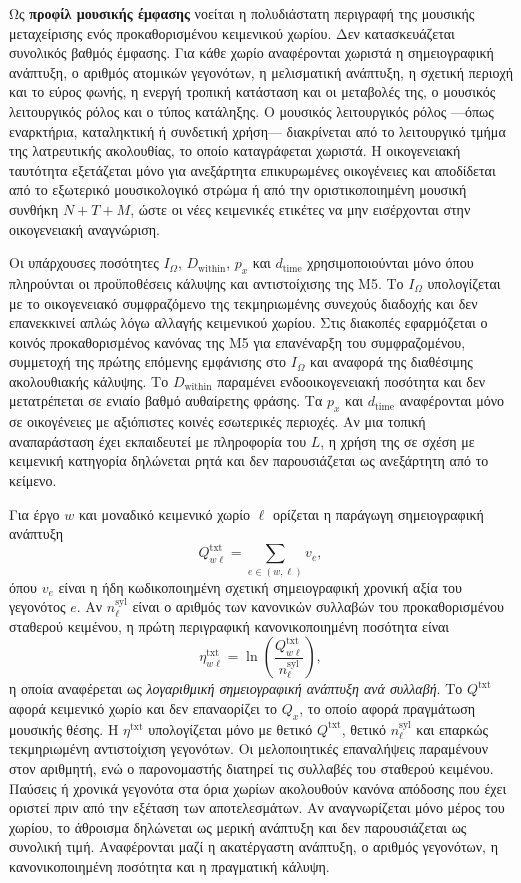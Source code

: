 \documentclass[11pt,a4paper]{article}
\begin{document}
Ως \textbf{προφίλ μουσικής έμφασης} νοείται η πολυδιάστατη περιγραφή της μουσικής μεταχείρισης ενός προκαθορισμένου κειμενικού χωρίου. Δεν κατασκευάζεται συνολικός βαθμός έμφασης. Για κάθε χωρίο αναφέρονται χωριστά η σημειογραφική ανάπτυξη, ο αριθμός ατομικών γεγονότων, η μελισματική ανάπτυξη, η σχετική περιοχή και το εύρος φωνής, η ενεργή τροπική κατάσταση και οι μεταβολές της, ο μουσικός λειτουργικός ρόλος και ο τύπος κατάληξης. Ο μουσικός λειτουργικός ρόλος ---όπως εναρκτήρια, καταληκτική ή συνδετική χρήση--- διακρίνεται από το λειτουργικό τμήμα της λατρευτικής ακολουθίας, το οποίο καταγράφεται χωριστά. Η οικογενειακή ταυτότητα εξετάζεται μόνο για ανεξάρτητα επικυρωμένες οικογένειες και αποδίδεται από το εξωτερικό μουσικολογικό στρώμα ή από την οριστικοποιημένη μουσική συνθήκη $N{+}T{+}M$, ώστε οι νέες κειμενικές ετικέτες να μην εισέρχονται στην οικογενειακή αναγνώριση.

Οι υπάρχουσες ποσότητες $I_{\Omega}$, $D_{\mathrm{within}}$, $p_x$ και $d_{\mathrm{time}}$ χρησιμοποιούνται μόνο όπου πληρούνται οι προϋποθέσεις κάλυψης και αντιστοίχισης της M5. Το $I_{\Omega}$ υπολογίζεται με το οικογενειακό συμφραζόμενο της τεκμηριωμένης συνεχούς διαδοχής και δεν επανεκκινεί απλώς λόγω αλλαγής κειμενικού χωρίου. Στις διακοπές εφαρμόζεται ο κοινός προκαθορισμένος κανόνας της M5 για επανέναρξη του συμφραζομένου, συμμετοχή της πρώτης επόμενης εμφάνισης στο $I_{\Omega}$ και αναφορά της διαθέσιμης ακολουθιακής κάλυψης. Το $D_{\mathrm{within}}$ παραμένει ενδοοικογενειακή ποσότητα και δεν μετατρέπεται σε ενιαίο βαθμό αυθαίρετης φράσης. Τα $p_x$ και $d_{\mathrm{time}}$ αναφέρονται μόνο σε οικογένειες με αξιόπιστες κοινές εσωτερικές περιοχές. Αν μια τοπική αναπαράσταση έχει εκπαιδευτεί με πληροφορία του $L$, η χρήση της σε σχέση με κειμενική κατηγορία δηλώνεται ρητά και δεν παρουσιάζεται ως ανεξάρτητη από το κείμενο.

Για έργο $w$ και μοναδικό κειμενικό χωρίο $\ell$ ορίζεται η παράγωγη σημειογραφική ανάπτυξη
\[
Q^{\mathrm{txt}}_{w\ell}=\sum_{e\in(w,\ell)} v_e,
\]
όπου $v_e$ είναι η ήδη κωδικοποιημένη σχετική σημειογραφική χρονική αξία του γεγονότος $e$. Αν $n^{\mathrm{syl}}_{\ell}$ είναι ο αριθμός των κανονικών συλλαβών του προκαθορισμένου σταθερού κειμένου, η πρώτη περιγραφική κανονικοποιημένη ποσότητα είναι
\[
\eta^{\mathrm{txt}}_{w\ell}=\ln\!\left(\frac{Q^{\mathrm{txt}}_{w\ell}}{n^{\mathrm{syl}}_{\ell}}\right),
\]
η οποία αναφέρεται ως \emph{λογαριθμική σημειογραφική ανάπτυξη ανά συλλαβή}. Το $Q^{\mathrm{txt}}$ αφορά κειμενικό χωρίο και δεν επαναορίζει το $Q_x$, το οποίο αφορά πραγμάτωση μουσικής θέσης. Η $\eta^{\mathrm{txt}}$ υπολογίζεται μόνο με θετικό $Q^{\mathrm{txt}}$, θετικό $n^{\mathrm{syl}}_{\ell}$ και επαρκώς τεκμηριωμένη αντιστοίχιση γεγονότων. Οι μελοποιητικές επαναλήψεις παραμένουν στον αριθμητή, ενώ ο παρονομαστής διατηρεί τις συλλαβές του σταθερού κειμένου. Παύσεις ή χρονικά γεγονότα στα όρια χωρίων ακολουθούν κανόνα απόδοσης που έχει οριστεί πριν από την εξέταση των αποτελεσμάτων. Αν αναγνωρίζεται μόνο μέρος του χωρίου, το άθροισμα δηλώνεται ως μερική ανάπτυξη και δεν παρουσιάζεται ως συνολική τιμή. Αναφέρονται μαζί η ακατέργαστη ανάπτυξη, ο αριθμός γεγονότων, η κανονικοποιημένη ποσότητα και η πραγματική κάλυψη.
\end{document}
